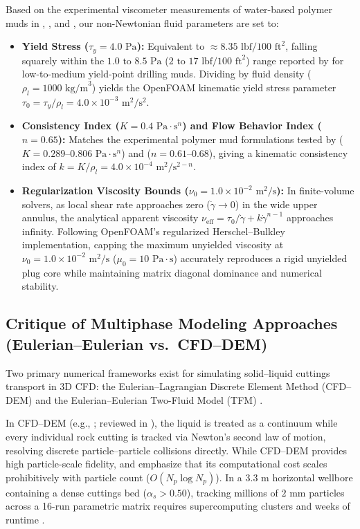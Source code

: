 Based on the experimental viscometer measurements of water-based polymer muds in \citet{Sorgun2010}, \citet{Kelessidis2006}, and \citet{Hajipour2020}, our non-Newtonian fluid parameters are set to:
\begin{itemize}
    \item \textbf{Yield Stress ($\tau_y = 4.0\text{ Pa}$):} Equivalent to $\approx 8.35\text{ lbf}/100\text{ ft}^2$, falling squarely within the $1.0\text{ to } 8.5\text{ Pa}$ ($2\text{ to } 17\text{ lbf}/100\text{ ft}^2$) range reported by \citet{Hajipour2020} for low-to-medium yield-point drilling muds. Dividing by fluid density ($\rho_l = 1000\text{ kg/m}^3$) yields the OpenFOAM kinematic yield stress parameter $\tau_0 = \tau_y/\rho_l = 4.0 \times 10^{-3}\text{ m}^2/\text{s}^2$.
    \item \textbf{Consistency Index ($K = 0.4\text{ Pa}\cdot\text{s}^n$) and Flow Behavior Index ($n = 0.65$):} Matches the experimental polymer mud formulations tested by \citet{Sorgun2010} ($K = 0.289\text{--}0.806\text{ Pa}\cdot\text{s}^n$) and \citet{Hajipour2020} ($n = 0.61\text{--}0.68$), giving a kinematic consistency index of $k = K/\rho_l = 4.0 \times 10^{-4}\text{ m}^2/\text{s}^{2-n}$.
    \item \textbf{Regularization Viscosity Bounds ($\nu_0 = 1.0 \times 10^{-2}\text{ m}^2/\text{s}$):} In finite-volume solvers, as local shear rate approaches zero ($\dot{\gamma} \to 0$) in the wide upper annulus, the analytical apparent viscosity $\nu_{\text{eff}} = \tau_0/\dot{\gamma} + k\dot{\gamma}^{n-1}$ approaches infinity. Following OpenFOAM's regularized Herschel--Bulkley implementation, capping the maximum unyielded viscosity at $\nu_0 = 1.0 \times 10^{-2}\text{ m}^2/\text{s}$ ($\mu_0 = 10\text{ Pa}\cdot\text{s}$) accurately reproduces a rigid unyielded plug core while maintaining matrix diagonal dominance and numerical stability.
\end{itemize}

\subsection{Critique of Multiphase Modeling Approaches (Eulerian--Eulerian vs.\ CFD--DEM)}
Two primary numerical frameworks exist for simulating solid--liquid cuttings transport in 3D CFD: the Eulerian--Lagrangian Discrete Element Method (CFD--DEM) and the Eulerian--Eulerian Two-Fluid Model (TFM) \citep{Hajipour2020, Li2026}.

In CFD--DEM (e.g., \citealt{Akhshik2015}; reviewed in \citealt{Li2026}), the liquid is treated as a continuum while every individual rock cutting is tracked via Newton's second law of motion, resolving discrete particle--particle collisions directly. While CFD--DEM provides high particle-scale fidelity, \citet{Li2026} and \citet{Hajipour2020} emphasize that its computational cost scales prohibitively with particle count ($O(N_p \log N_p)$). In a $3.3\text{ m}$ horizontal wellbore containing a dense cuttings bed ($\alpha_s > 0.50$), tracking millions of $2\text{ mm}$ particles across a 16-run parametric matrix requires supercomputing clusters and weeks of runtime \citep{Li2026}.


